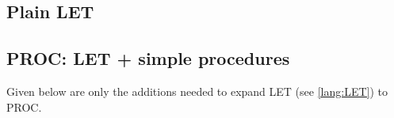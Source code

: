 \documentclass[../codeprint.tex]{subfiles}
\begin{document}
\subsection{Plain LET}
\label{lang:LET}



\subsection{PROC: LET + simple procedures}
\label{lang:PROC}
Given below are only the additions needed to expand LET (see \autoref{lang:LET}) to PROC.


\end{document}
